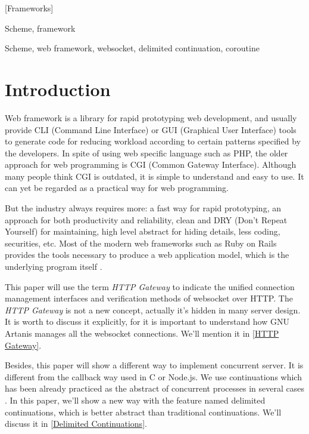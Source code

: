 \documentclass[preprint,numbers,numberedpars,10pt]{sigplanconf}
\begin{document}
[Frameworks]

\terms
Scheme, framework

\keywords
Scheme, web framework, websocket, delimited continuation, coroutine

\section{Introduction}

Web framework is a library for rapid prototyping web development, and usually provide CLI (Command Line Interface) or
GUI (Graphical User Interface) tools to generate code for reducing workload according to certain patterns specified by the developers.
In spite of using web specific language such as PHP, the older approach for web programming is CGI (Common Gateway Interface).
Although many people think CGI is outdated, it is simple to understand and easy to use.
It can yet be regarded as a practical way for web programming.

But the industry always requires more: a fast way for rapid prototyping, an approach for both productivity and reliability, clean and DRY
(Don't Repeat Yourself) for maintaining, high level abstract for hiding details, less coding, securities, etc.
Most of the modern web frameworks such as Ruby on Rails provides the tools necessary to produce a web application model,
which is the underlying program itself \citep{1597080}. 

This paper will use the term {\it HTTP Gateway} to indicate the unified connection management interfaces and verification methods of websocket
over HTTP. The {\it HTTP Gateway} is not a new concept, actually it's hidden in many server design. It is worth to discuss it explicitly,
for it is important to understand how GNU Artanis manages all the websocket connections. We'll mention it in \ref{HTTP Gateway}.

Besides, this paper will show a different way to implement concurrent server. It is different from the callback way used in C or Node.js.
We use continuations which has been already practiced as the abstract of concurrent processes in several cases
\citep{Krishnamurthi2007}\citep{Hieb:1990:CC:99164.99178}\citep{Hieb:1994:SUB:184324.184330}.
In this paper, we'll show a new way with the feature named delimited continuations, which is better abstract than traditional continuations.
We'll discuss it in \ref{Delimited Continuations}.
\end{document}
